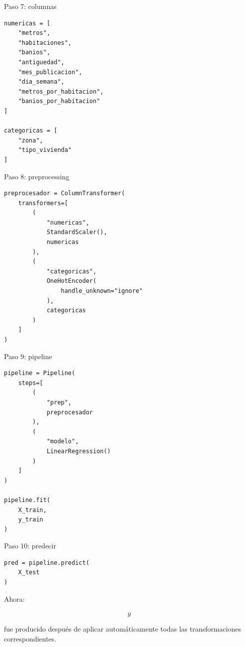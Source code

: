 \documentclass[aspectratio=169,11pt]{beamer}
\begin{document}

\begin{frame}[fragile]{Paso 7: columnas}

\begin{lstlisting}
numericas = [
    "metros",
    "habitaciones",
    "banios",
    "antiguedad",
    "mes_publicacion",
    "dia_semana",
    "metros_por_habitacion",
    "banios_por_habitacion"
]

categoricas = [
    "zona",
    "tipo_vivienda"
]
\end{lstlisting}

\end{frame}


\begin{frame}[fragile]{Paso 8: preprocessing}

\begin{lstlisting}
preprocesador = ColumnTransformer(
    transformers=[
        (
            "numericas",
            StandardScaler(),
            numericas
        ),
        (
            "categoricas",
            OneHotEncoder(
                handle_unknown="ignore"
            ),
            categoricas
        )
    ]
)
\end{lstlisting}

\end{frame}


\begin{frame}[fragile]{Paso 9: pipeline}

\begin{lstlisting}
pipeline = Pipeline(
    steps=[
        (
            "prep",
            preprocesador
        ),
        (
            "modelo",
            LinearRegression()
        )
    ]
)

pipeline.fit(
    X_train,
    y_train
)
\end{lstlisting}

\end{frame}


\begin{frame}[fragile]{Paso 10: predecir}

\begin{lstlisting}
pred = pipeline.predict(
    X_test
)
\end{lstlisting}

Ahora:

\[
\hat y
\]

fue producido después de aplicar automáticamente todas
las transformaciones correspondientes.

\end{frame}
\end{document}
